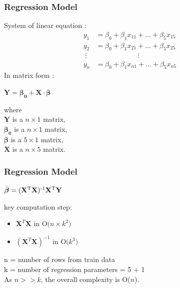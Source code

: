 \documentclass[11pt]{beamer}
\begin{document}
\begin{frame}
\frametitle{Regression Model}
\begin{tcolorbox}[colback=blue!5,colframe=blue!40!black,title=Regression model]
System of linear equation :
\begin{equation}
\begin{alignedat}{4}
y_1 &= \beta_0  + \beta_1 x_{11} + \dots + \beta_5 x_{15}\\
y_2 &= \beta_0 + \beta_1 x_{21} + \dots + \beta_5 x_{25}\\
\;\vdots  &            \qquad\qquad\qquad\vdots \\
y_n &= \beta_0 + \beta_1 x_{n1} + \dots + \beta_5 x_{n5}
\end{alignedat}
\end{equation}
In matrix form :

\centering
\(\textbf{Y}= \boldsymbol{\beta_0}+\textbf{X} \cdot \boldsymbol{\beta} \)

\raggedright
where\\
\(\textbf{Y}\) is a \(n\times1\) matrix,\\
\(\boldsymbol{\beta_0}\) is a \(n\times 1\) matrix,\\
\(\boldsymbol{\beta}\) is a \(5\times 1\) matrix,\\
\(\textbf{X}\) is a \(n\times 5\) matrix.
\end{tcolorbox}
\end{frame}



\begin{frame}
\frametitle{Regression Model}
\begin{tcolorbox}[colback=blue!5,colframe=blue!40!black,title=Complexity]
\begin{center}
\(\hat{\boldsymbol{\beta}} = (\textbf{X} \textsuperscript{T} \textbf{X} ) \textsuperscript{-1} \textbf{X} \textsuperscript{T} \textbf{Y}  \) \\
\end{center}
key computation step:
\begin{itemize}
\item \(\textbf{X}^T\textbf{X} \mbox{ in O(} n\times k^2 \mbox{)}\)
\item \((\textbf{X}^T\textbf{X})^{-1} \mbox{ in O(} k^3 \mbox{)}\)
\end{itemize}
n = number of rows from train data\\
k = number of regression parameters = 5 + 1\\
As \(n>>k\), the overall complexity is O(\(n\)).
\end{tcolorbox}
\end{frame}
\end{document}
